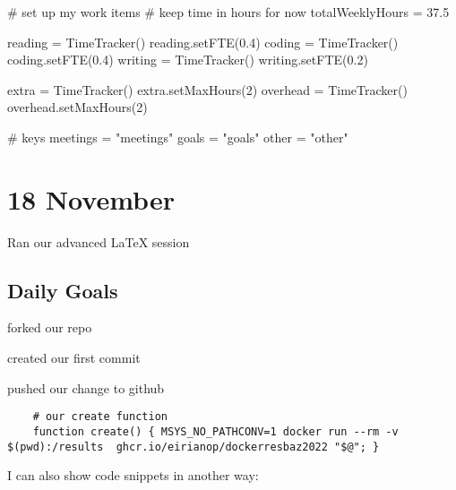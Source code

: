 \documentclass[weekly_log.tex]{subfiles}
\begin{document}

\begin{sagesilent}
    # set up my work items 
    # keep time in hours for now
    totalWeeklyHours = 37.5

    reading  = TimeTracker()
    reading.setFTE(0.4)
    coding   = TimeTracker()
    coding.setFTE(0.4)
    writing  = TimeTracker()
    writing.setFTE(0.2)

    extra    = TimeTracker()
    extra.setMaxHours(2)
    overhead = TimeTracker()
    overhead.setMaxHours(2)

    # keys
    meetings = "meetings"
    goals  = "goals"
    other = "other"
\end{sagesilent}




\section{18 November}
Ran our advanced \LaTeX{} session

\subsection{Daily Goals}
\begin{todolist}
    \item[\done] forked our repo 
    \item[\done] created our first commit
    \item[\done] pushed our change to github
\end{todolist}

\begin{verbatim}
    # our create function 
    function create() { MSYS_NO_PATHCONV=1 docker run --rm -v $(pwd):/results  ghcr.io/eirianop/dockerresbaz2022 "$@"; }
\end{verbatim}

I can also show code snippets in another way:
\end{document}
